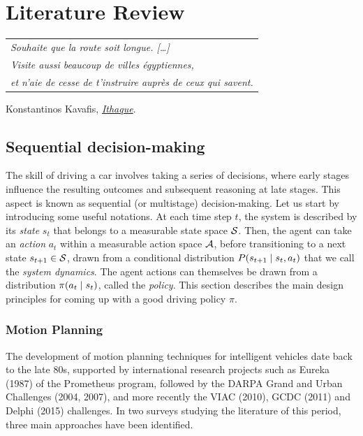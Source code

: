 
\graphicspath{{2-Chapters/2-Chapter/}}

\chapter{Literature Review}
\label{chapter:2}

\begin{flushright}
	\begin{tabular}{@{}l@{}}
		\emph{Souhaite que la route soit longue. [\dots]}\\
		\emph{Visite aussi beaucoup de villes égyptiennes,}\\
		\emph{et n’aie de cesse de t’instruire auprès de ceux qui savent.}\\
	\end{tabular}
	
	Konstantinos Kavafis, \href{https://eleurent.github.io/sisyphe/texts/ithaki.html}{\emph{Ithaque}}.
\end{flushright}

\section{Sequential decision-making}
\label{sec:sequential-decision-making}

The skill of driving a car involves taking a series of decisions, where early stages influence the resulting outcomes and subsequent reasoning at late stages. This aspect is known as sequential (or multistage) decision-making. Let us start by introducing some useful notations. At each time step $t$, the system is described by its \emph{state} $s_t$ that belongs to a measurable state space $\mathcal{S}$. Then, the agent can take an \emph{action} $a_t$ within a measurable action space $\mathcal{A}$, before transitioning to a next state $s_{t+1}\in\mathcal{S}$, drawn from a conditional distribution $P\lparen s_{t+1} \mid s_t, a_t\rparen$ that we call the \emph{system dynamics}. The agent actions can themselves be drawn from a distribution $\pi\lparen a_t\mid s_t\rparen$, called the \emph{policy}. This section describes the main design principles for coming up with a good driving policy $\pi$.

\subsection{Motion Planning}

The development of motion planning techniques for intelligent vehicles date back to the late 80s, supported by international research projects such as Eureka (1987) of the Prometheus program, followed by the DARPA Grand and Urban Challenges (2004, 2007), and more recently the VIAC (2010), GCDC (2011) and Delphi (2015) challenges. In two surveys \citep{Gonzalez2016,Paden2016} studying the literature of this period, three main approaches have been identified.

